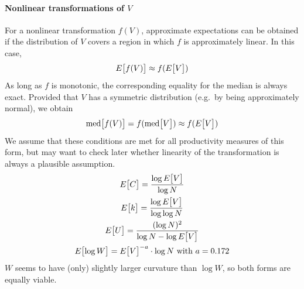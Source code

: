 \documentclass[a4paper]{article}
\begin{document}
\paragraph*{Nonlinear transformations of $V$}
For a nonlinear transformation $f(V)$, approximate expectations can be obtained
if the distribution of $V$ covers a region in which $f$ is approximately linear.
In this case,
\begin{equation}
  \label{eq:prod:exp-nonlinear}
  E_{}\bigl[f(V)\bigr] \approx f(E_{}\bigl[V\bigr])
\end{equation}
As long as $f$ is monotonic, the corresponding equality for the median is
always exact. Provided that $V$ has a symmetric distribution (e.g.\ by being
approximately normal), we obtain
\begin{equation}
  \label{eq:prod:median-nonlinear}
  \text{med}\bigl[ f(V) \bigr] = f( \text{med}\bigl[ V \bigr] )
  \approx f( E_{}\bigl[V\bigr] )
\end{equation}
We assume that these conditions are met for all productivity measures of this
form, but may want to check later whether linearity of the transformation is
always a plausible assumption.
\begin{gather}
  E_{}\bigl[C\bigr] = \frac{\log E_{}\bigl[V\bigr]}{\log N}\\
  E_{}\bigl[k\bigr] = \frac{\log E_{}\bigl[V\bigr]}{\log \log N}\\
  E_{}\bigl[U\bigr] = \frac{(\log N)^2}{\log N - \log E_{}\bigl[V\bigr]}\\
  E_{}\bigl[\log W\bigr] = E_{}\bigl[V\bigr]^{-a}\cdot \log N \text{ with } a = 0.172
\end{gather}
$W$ seems to have (only) slightly larger curvature than $\log W$, so both
forms are equally viable.
\end{document}
